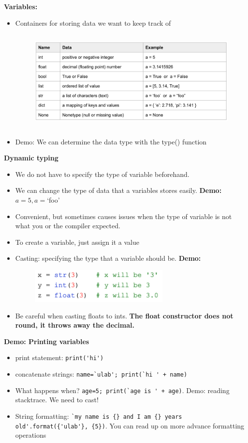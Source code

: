 \documentclass[12pt]{article}
\numberwithin{equation}{section}
\begin{document}
\textbf{Variables:}
\begin{itemize}
    \item Containers for storing data we want to keep track of
    \begin{figure}[H]
	    \centering
	    \includegraphics[height=5.1cm] {data}
\end{figure}
    \item Demo: We can determine the data type with the type() function
\end{itemize}

\textbf{Dynamic typing}
\begin{itemize}
    \item We do not have to specify the type of variable beforehand.
    \item We can change the type of data that a variables stores easily. \textbf{Demo: }$a=5, a=$`foo'
    \item Convenient, but sometimes causes issues when the type of variable is not what you or the compiler expected.
    \item To create a variable, just assign it a value
    \item Casting: specifying the type that a variable should be. \textbf{Demo:}
    \begin{figure}[H]
	    \centering
	    \includegraphics[width=7cm] {cast}
    \end{figure}
    \item Be careful when casting floats to ints. \textbf{The float constructor does not round, it throws away the decimal.}
\end{itemize}

\textbf{Demo: Printing variables}
\begin{itemize}
    \item print statement: \verb|print('hi')|
    \item concatenate strings: \verb|name=`ulab'; print(`hi ' + name)|
    \item What happens when? \verb|age=5; print(`age is ' + age)|. Demo: reading stacktrace. We need to cast!
    \item String formatting: \verb|`my name is {} and I am {} years old'.format({'ulab'}, {5})|. You can read up on more advance formatting operations
\end{itemize}
\end{document}
